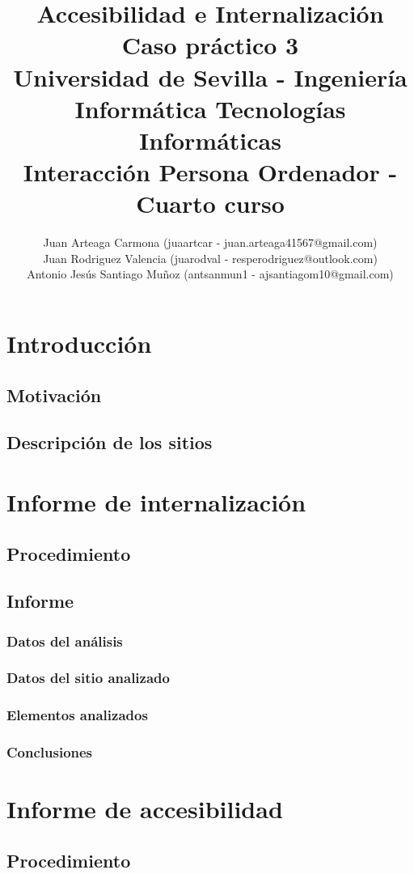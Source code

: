 \documentclass[a4paper,11pt]{article}
\title{
        \textbf{Accesibilidad e Internalización}\large\\
        \textbf{Caso práctico 3}\\
        \medskip
        Universidad de Sevilla - Ingeniería Informática Tecnologías Informáticas\\
        Interacción Persona Ordenador - Cuarto curso}
\author{Juan Arteaga Carmona (juaartcar - juan.arteaga41567@gmail.com)\\
        Juan Rodriguez Valencia (juarodval - resperodriguez@outlook.com)\\
        Antonio Jesús Santiago Muñoz (antsanmun1 - ajsantiagom10@gmail.com)\\
}
\begin{document}
\maketitle

\newpage
\tableofcontents
\listoffigures
\newpage


\section{Introducción}
\subsection{Motivación}
\subsection{Descripción de los sitios}

\section{Informe de internalización}
\subsection{Procedimiento}
\subsection{Informe}
\subsubsection{Datos del análisis}
\subsubsection{Datos del sitio analizado}
\subsubsection{Elementos analizados}
\subsubsection{Conclusiones}


\section{Informe de accesibilidad}
\subsection{Procedimiento}
\end{document}
